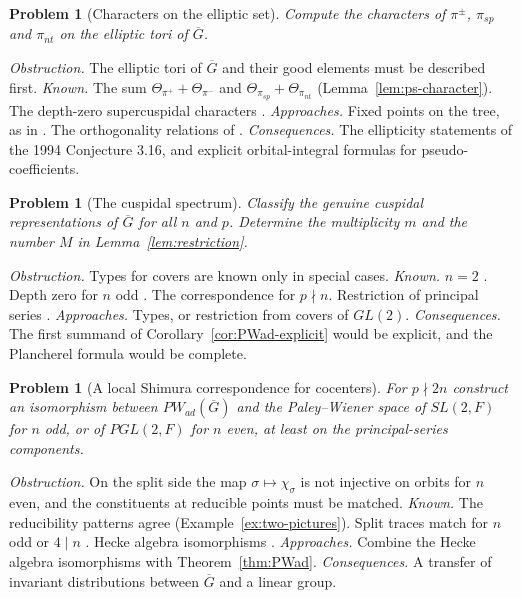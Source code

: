 \documentclass[12pt,letterpaper]{article}
\numberwithin{equation}{section}
\newtheorem{problem}[theorem]{Problem}
\theoremstyle{definition}
\newcommand{\bG}{\overline{G}}
\begin{document}
\begin{problem}[Characters on the elliptic set]\label{prob:characters}
Compute the characters of $\pi^\pm$, $\pi_{sp}$ and $\pi_{nt}$ on the elliptic tori of
$\bG$.
\end{problem}
\emph{Obstruction.}  The elliptic tori of $\bG$ and their good elements must be described
first.  \emph{Known.}  The sum $\Theta_{\pi^+}+\Theta_{\pi^-}$ and
$\Theta_{\pi_{sp}}+\Theta_{\pi_{nt}}$ (Lemma~\ref{lem:ps-character}).  The depth-zero
supercuspidal characters \cite{JoCh}.  \emph{Approaches.}  Fixed points on the tree, as in
\cite{JoCh}.  The orthogonality relations of \cite[Remarque~5.8.11]{Li12}.
\emph{Consequences.}  The ellipticity statements of the 1994 Conjecture 3.16, and explicit
orbital-integral formulas for pseudo-coefficients.

\begin{problem}[The cuspidal spectrum]\label{prob:cuspidal}
Classify the genuine cuspidal representations of $\bG$ for all $n$ and $p$.  Determine
the multiplicity $m$ and the number $M$ in Lemma~\ref{lem:restriction}.
\end{problem}
\emph{Obstruction.}  Types for covers are known only in special cases.  \emph{Known.}
$n=2$ \cite{GPS83}.  Depth zero for $n$ odd \cite{JoCh}.  The correspondence \cite{Jo99}
for $p\nmid n$.  Restriction of principal series \cite{GSS26}.  \emph{Approaches.}  Types,
or restriction from covers of $GL(2)$.  \emph{Consequences.}  The first summand of
Corollary~\ref{cor:PWad-explicit} would be explicit, and the Plancherel formula would be
complete.

\begin{problem}[A local Shimura correspondence for cocenters]\label{prob:shimura}
For $p\nmid2n$ construct an isomorphism between $PW_{ad}(\bG)$ and the Paley--Wiener
space of $SL(2,F)$ for $n$ odd, or of $PGL(2,F)$ for $n$ even, at least on the
principal-series components.
\end{problem}
\emph{Obstruction.}  On the split side the map $\sigma\mapsto\chi_\sigma$ is not injective
on orbits for $n$ even, and the constituents at reducible points must be matched.
\emph{Known.}  The reducibility patterns agree (Example~\ref{ex:two-pictures}).  Split
traces match for $n$ odd or $4\mid n$ \cite{JoUD}.  Hecke algebra isomorphisms
\cite{Jo98,GGK24}.  \emph{Approaches.}  Combine the Hecke algebra isomorphisms with
Theorem~\ref{thm:PWad}.  \emph{Consequences.}  A transfer of invariant distributions
between $\bG$ and a linear group.
\end{document}
